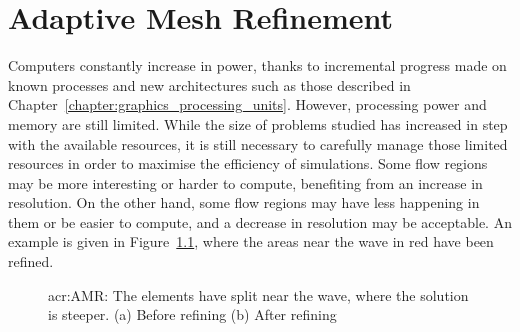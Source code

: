 \chapter{Adaptive Mesh Refinement}\label{chapter:adaptive_mesh_refinement} 

Computers constantly increase in power, thanks to incremental progress made on known processes and
new architectures such as those described in Chapter~\ref{chapter:graphics_processing_units}.
However, processing power and memory are still limited. While the size of problems studied has
increased in step with the available resources, it is still necessary to carefully manage those
limited resources in order to maximise the efficiency of simulations. Some flow regions may be more
interesting or harder to compute, benefiting from an increase in resolution. On the other hand, some
flow regions may have less happening in them or be easier to compute, and a decrease in resolution
may be acceptable. An example is given in Figure~\ref{fig:mesh_refinement}, where the areas near the
wave in red have been refined.

\begin{figure}[H]
    \centering
    \hfill
    \caption{\Acrlong{acr:AMR}: The elements have split near the wave, where the solution is steeper. (a) Before refining (b) After refining}\label{fig:mesh_refinement}
\end{figure}

